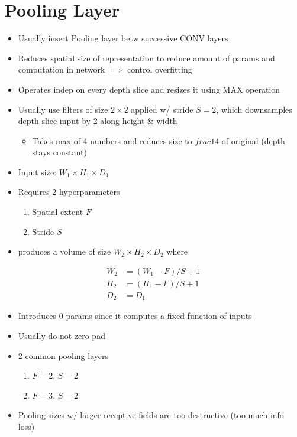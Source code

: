 \documentclass[a4paper,12pt]{article}
\begin{document}
\section{Pooling Layer}
\begin{itemize}
  \item Usually insert Pooling layer betw successive CONV layers
  \item Reduces spatial size of representation to reduce amount of params and computation in network $\implies$ control overfitting
  \item Operates indep on every depth slice and resizes it using MAX operation
  \item Usually use filters of size $2\times 2$ applied w/ stride $S = 2$, which downsamples depth slice input by 2 along height \& width
  \begin{itemize}
    \item Takes max of 4 numbers and reduces size to $frac{1}{4}$ of original (depth stays constant)
  \end{itemize}
\end{itemize}

\begin{itemize}
  \item Input size: $W_1\times H_1\times D_1$
  \item Requires 2 hyperparameters
  \begin{enumerate}
    \item Spatial extent $F$
    \item Stride $S$
  \end{enumerate}
  \item produces a volume of size $W_2\times H_2\times D_2$ where
\end{itemize}
\begin{align}
  W_2 &= (W_1 - F)/S + 1 \\
  H_2 &= (H_1 - F)/S + 1 \\
  D_2 &= D_1
\end{align}
\begin{itemize}
  \item Introduces 0 params since it computes a fixed function of inputs
  \item Usually do not zero pad
  \item 2 common pooling layers
  \begin{enumerate}
    \item $F = 2$, $S = 2$
    \item $F = 3$, $S = 2$
  \end{enumerate}
  \item Pooling sizes w/ larger receptive fields are too destructive (too much info loss)
\end{itemize}
\end{document}
